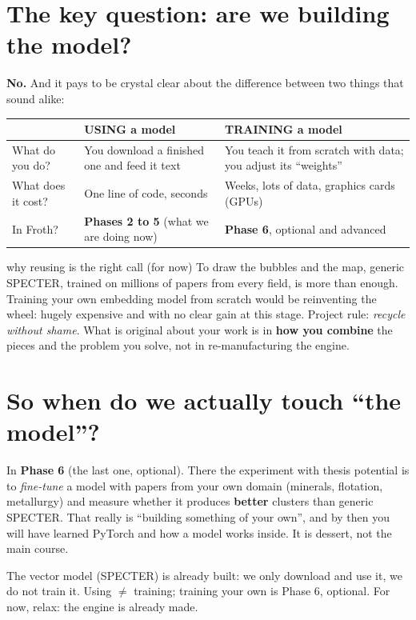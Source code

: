 \documentclass[11pt,a4paper]{article}
\begin{document}
\section{The key question: are we building the model?}

\textbf{No.} And it pays to be crystal clear about the difference between two things that
sound alike:

\begin{center}
\begin{tabular}{p{4.3cm} p{4.3cm} p{4.3cm}}
 & \textbf{USING a model} & \textbf{TRAINING a model} \\[2pt]
\hline
What do you do? & You download a finished one and feed it text & You teach it from scratch with data; you adjust its ``weights'' \\[6pt]
What does it cost? & One line of code, seconds & Weeks, lots of data, graphics cards (GPUs) \\[6pt]
In Froth? & \textbf{Phases 2 to 5} (what we are doing now) & \textbf{Phase 6}, optional and advanced \\
\end{tabular}
\end{center}

\begin{concepto}{why reusing is the right call (for now)}
To draw the bubbles and the map, generic SPECTER, trained on millions of papers from every
field, is more than enough. Training your own embedding model from scratch would be
reinventing the wheel: hugely expensive and with no clear gain at this stage. Project rule:
\emph{recycle without shame}. What is original about your work is in \textbf{how you combine}
the pieces and the problem you solve, not in re-manufacturing the engine.
\end{concepto}

\section{So when do we actually touch ``the model''?}

In \textbf{Phase 6} (the last one, optional). There the experiment with thesis potential is
to \emph{fine-tune} a model with papers from your own domain (minerals, flotation,
metallurgy) and measure whether it produces \textbf{better} clusters than generic SPECTER.
That really is ``building something of your own'', and by then you will have learned PyTorch
and how a model works inside. It is dessert, not the main course.

\begin{resumen}
The vector model (SPECTER) is already built: we only download and use it, we do not train it.
Using $\neq$ training; training your own is Phase 6, optional. For now, relax: the engine is
already made.
\end{resumen}
\end{document}
